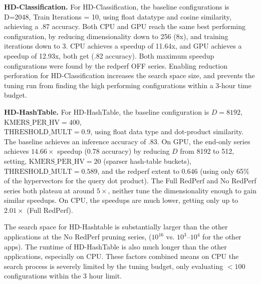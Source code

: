 \textbf{HD-Classification.}
For HD-Classification, the baseline configurations is D=2048, Train Iterations = 10, using float datatype and cosine similarity, achieving a .87 accuracy. Both CPU and GPU reach the same best performing configuration, by reducing dimensionality down to 256 (8x), and training iterations down to 3. CPU achieves a speedup of 11.64x, and GPU achieves a speedup of 12.93x, both get (.82 accuracy). Both maximum speedup configurations were found by the redperf OFF series. Enabling reduction perforation for HD-Classification increases the search space size, and prevents the tuning run from finding the high performing configurations within a 3-hour time budget. 

\textbf{HD-HashTable.}
For HD-HashTable, the baseline configuration is $D=8192$, $\text{KMERS\_PER\_HV}=400$, \\ $\text{THRESHOLD\_MULT}{=}0.9$, using float data type and dot-product similarity. The baseline achieves an inference accuracy of .83. On GPU, the end-only series achieves $14.66\times$ speedup (0.78 accuracy) by reducing $D$ from 8192 to 512, setting, $\text{KMERS\_PER\_HV}{=}20$ (sparser hash-table buckets), \\ $\text{THRESHOLD\_MULT}{=} 0.589$, and the redperf extent to $0.646$ (using only 65\% of the hypervectors for the query dot product). The Full RedPerf and No RedPerf series both plateau at around $5\times$, neither tune the dimensionality enough to gain similar speedups. On CPU, the speedups are much lower, getting only up to  $2.01\times$ (Full RedPerf). 

The search space for HD-Hashtable is substantially larger than the other applications at the No RedPerf pruning series, ($10^{16}$ vs. $10^{3}$--$10^{4}$ for the other apps). The runtime of HD-HashTable is also much longer than the other applications, especially on CPU. These factors combined means on CPU the search process is severely limited by the tuning budget, only evaluating $< 100$ configurations within the 3 hour limit. 


